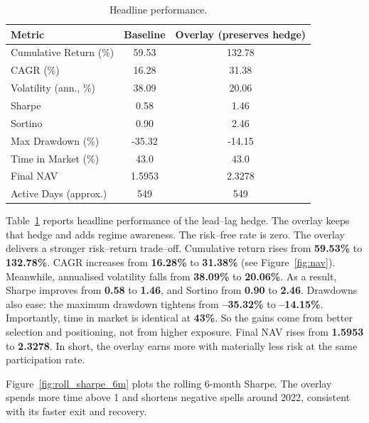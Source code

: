 \begin{table}[t]
\centering
\caption{Headline performance.}
\label{tab:main}
\small
\begin{tabular}{lcc}
\toprule
Metric & Baseline & Overlay (preserves hedge) \\
\midrule
Cumulative Return (\%)     & 59.53 & 132.78 \\
CAGR (\%)                  & 16.28 & 31.38  \\
Volatility (ann., \%)      & 38.09 & 20.06  \\
Sharpe                     & 0.58  & 1.46   \\
Sortino                    & 0.90  & 2.46   \\
Max Drawdown (\%)          & -35.32 & -14.15 \\
Time in Market (\%)        & 43.0  & 43.0   \\
Final NAV                  & 1.5953 & 2.3278 \\
Active Days (approx.)      & 549   & 549    \\
\bottomrule
\end{tabular}
\end{table}

Table~\ref{tab:main} reports headline performance of the lead--lag hedge. The overlay keeps that hedge and adds regime awareness. The risk--free rate is zero. The overlay delivers a stronger risk--return trade--off. Cumulative return rises from \textbf{59.53\%} to \textbf{132.78\%}. CAGR increases from \textbf{16.28\%} to \textbf{31.38\%} (see Figure~\ref{fig:nav}). Meanwhile, annualised volatility falls from \textbf{38.09\%} to \textbf{20.06\%}. As a result, Sharpe improves from \textbf{0.58} to \textbf{1.46}, and Sortino from \textbf{0.90} to \textbf{2.46}. Drawdowns also ease: the maximum drawdown tightens from \textbf{--35.32\%} to \textbf{--14.15\%}. Importantly, time in market is identical at \textbf{43\%}. So the gains come from better selection and positioning, not from higher exposure. Final NAV rises from \textbf{1.5953} to \textbf{2.3278}. In short, the overlay earns more with materially less risk at the same participation rate.

Figure~\ref{fig:roll_sharpe_6m} plots the rolling 6-month Sharpe. 
The overlay spends more time above 1 and shortens negative spells around 2022, consistent with its faster exit and recovery.


